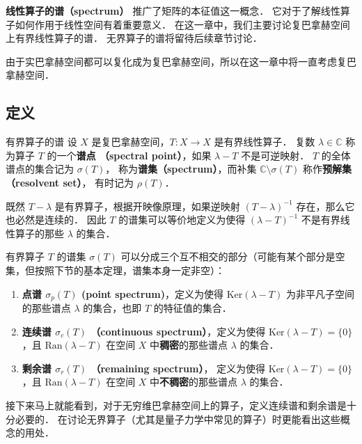 
\textbf{线性算子的谱（spectrum）} 推广了矩阵的本征值这一概念． 它对于了解线性算子如何作用于线性空间有着重要意义． 在这一章中，我们主要讨论复巴拿赫空间上有界线性算子的谱． 无界算子的谱将留待后续章节讨论．

由于实巴拿赫空间都可以复化成为复巴拿赫空间，所以在这一章中将一直考虑复巴拿赫空间．

\subsection{定义}
\begin{definition}{有界算子的谱}
设 $X$ 是复巴拿赫空间，$T:X\to X$ 是有界线性算子． 复数 $\lambda\in\mathbb{C}$ 称为算子 $T$ 的一个\textbf{谱点 （spectral point）}，如果 $\lambda-T$ 不是可逆映射． $T$ 的全体谱点的集合记为 $\sigma(T)$， 称为\textbf{谱集（spectrum）}，而补集 $\mathbb{C}\setminus\sigma(T)$ 称作\textbf{预解集（resolvent set）}， 有时记为 $\rho(T)$．
\end{definition}

既然 $T-\lambda$ 是有界算子，根据开映像原理，如果逆映射 $(T-\lambda)^{-1}$ 存在，那么它也必然是连续的． 因此 $T$ 的谱集可以等价地定义为使得 $(\lambda-T)^{-1}$ 不是有界线性算子的那些 $\lambda$ 的集合．

有界算子 $T$ 的谱集 $\sigma(T)$ 可以分成三个互不相交的部分（可能有某个部分是空集，但按照下节的基本定理，谱集本身一定非空）：

\begin{enumerate}
\item \textbf{点谱 $\sigma_p(T)$ (point spectrum)}，定义为使得 $\text{Ker}(\lambda-T)$ 为非平凡子空间的那些谱点 $\lambda$ 的集合，也即 $T$ 的特征值的集合．

\item \textbf{连续谱 $\sigma_c(T)$ （continuous spectrum）}，定义为使得 $\text{Ker}(\lambda-T)=\{0\}$，且 $\text{Ran}(\lambda-T)$ 在空间 $X$ 中\textbf{稠密}的那些谱点 $\lambda$ 的集合．

\item \textbf{剩余谱 $\sigma_r(T)$ （remaining spectrum）}， 定义为使得 $\text{Ker}(\lambda-T)=\{0\}$，且 $\text{Ran}(\lambda-T)$ 在空间 $X$ 中\textbf{不稠密}的那些谱点 $\lambda$ 的集合．
\end{enumerate}

接下来马上就能看到，对于无穷维巴拿赫空间上的算子，定义连续谱和剩余谱是十分必要的． 在讨论无界算子（尤其是量子力学中常见的算子）时更能看出这些概念的用处．

